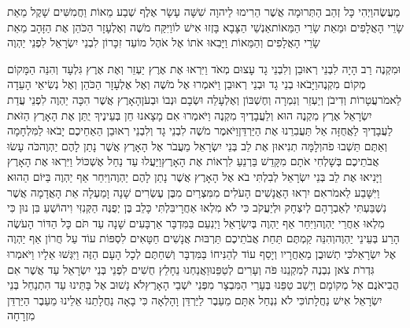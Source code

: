 \documentclass[../main/main.tex]{subfiles}
\begin{document}
\begin{multicols}{\ncols}
מַעֲשֶׂה\PreVerseSpace{}וַיְהִי כָּל זְהַב הַתְּרוּמָה אֲשֶׁר הֵרִימוּ לַיהוָה שִׁשָּׁה עָשָׂר אֶלֶף שְׁבַע מֵאוֹת וַחֲמִשִּׁים שָׁקֶל מֵאֵת שָׂרֵי הָאֲלָפִים וּמֵאֵת שָׂרֵי הַמֵּאוֹת\PreVerseSpace{}אַנְשֵׁי הַצָּבָא בָּזְזוּ אִישׁ לוֹ\PreVerseSpace{}וַיִּקַּח מֹשֶׁה וְאֶלְעָזָר הַכֹּהֵן אֶת הַזָּהָב מֵאֵת שָׂרֵי הָאֲלָפִים וְהַמֵּאוֹת וַיָּבִאוּ אֹתוֹ אֶל אֹהֶל מוֹעֵד זִכָּרוֹן לִבְנֵי יִשְׂרָאֵל לִפְנֵי יַהְוֶה\OpenSection{}\par
{}וּמִקְנֶה רַב הָיָה לִבְנֵי רְאוּבֵן וְלִבְנֵי גָד עָצוּם מְאֹד וַיִּרְאוּ אֶת אֶרֶץ יַעְזֵר וְאֶת אֶרֶץ גִּלְעָד וְהִנֵּה הַמָּקוֹם מְקוֹם מִקְנֶה\PreVerseSpace{}וַיָּבֹאוּ בְנֵי גָד וּבְנֵי רְאוּבֵן וַיֹּאמְרוּ אֶל מֹשֶׁה וְאֶל אֶלְעָזָר הַכֹּהֵן וְאֶל נְשִׂיאֵי הָעֵדָה לֵאמֹר\PreVerseSpace{}עֲטָרוֹת וְדִיבֹן וְיַעְזֵר וְנִמְרָה וְחֶשְׁבּוֹן וְאֶלְעָלֵה וּשְׂבָם וּנְבוֹ וּבְעֹן\PreVerseSpace{}הָאָרֶץ אֲשֶׁר הִכָּה יַהְוֶה לִפְנֵי עֲדַת יִשְׂרָאֵל אֶרֶץ מִקְנֶה הוּא וְלַעֲבָדֶיךָ מִקְנֶה \ClosedSection{}וַיֹּאמְרוּ אִם מָצָאנוּ חֵן בְּעֵינֶיךָ יֻתַּן אֶת הָאָרֶץ הַזֹּאת לַעֲבָדֶיךָ לַאֲחֻזָּה אַל תַּעֲבִרֵנוּ אֶת הַיַּרְדֵּן\PreVerseSpace{}וַיֹּאמֶר מֹשֶׁה לִבְנֵי גָד וְלִבְנֵי רְאוּבֵן הַאַחֵיכֶם יָבֹאוּ לַמִּלְחָמָה וְאַתֶּם תֵּשְׁבוּ פֹה\PreVerseSpace{}וְלָמָּה תְנִיאוּן\SubEnd{} אֶת לֵב בְּנֵי יִשְׂרָאֵל מֵעֲבֹר אֶל הָאָרֶץ אֲשֶׁר נָתַן לָהֶם יַהְוֶה\PreVerseSpace{}כֹּה עָשׂוּ אֲבֹתֵיכֶם בְּשָׁלְחִי אֹתָם מִקָּדֵשׁ בַּרְנֵעַ לִרְאוֹת אֶת הָאָרֶץ\PreVerseSpace{}וַיַּעֲלוּ עַד נַחַל אֶשְׁכּוֹל וַיִּרְאוּ אֶת הָאָרֶץ וַיָּנִיאוּ אֶת לֵב בְּנֵי יִשְׂרָאֵל לְבִלְתִּי בֹא אֶל הָאָרֶץ אֲשֶׁר נָתַן לָהֶם יַהְוֶה\PreVerseSpace{}וַיִּחַר אַף יַהְוֶה בַּיּוֹם הַהוּא וַיִּשָּׁבַע לֵאמֹר\PreVerseSpace{}אִם יִרְאוּ הָאֲנָשִׁים הָעֹלִים מִמִּצְרַיִם מִבֶּן עֶשְׂרִים שָׁנָה וָמַעְלָה אֵת הָאֲדָמָה אֲשֶׁר נִשְׁבַּעְתִּי לְאַבְרָהָם לְיִצְחָק וּלְיַעֲקֹב כִּי לֹא מִלְאוּ אַחֲרָי\PreVerseSpace{}בִּלְתִּי כָּלֵב בֶּן יְפֻנֶּה הַקְּנִזִּי וִיהוֹשֻׁעַ בִּן נוּן כִּי מִלְאוּ אַחֲרֵי יַהְוֶה\PreVerseSpace{}וַיִּחַר אַף יַהְוֶה בְּיִשְׂרָאֵל וַיְנִעֵם בַּמִּדְבָּר אַרְבָּעִים שָׁנָה עַד תֹּם כָּל הַדּוֹר הָעֹשֶׂה הָרַע בְּעֵינֵי יַהְוֶה\PreVerseSpace{}וְהִנֵּה קַמְתֶּם תַּחַת אֲבֹתֵיכֶם תַּרְבּוּת אֲנָשִׁים חַטָּאִים לִסְפּוֹת עוֹד עַל חֲרוֹן אַף יַהְוֶה אֶל יִשְׂרָאֵל\PreVerseSpace{}כִּי תְשׁוּבֻן מֵאַחֲרָיו וְיָסַף עוֹד לְהַנִּיחוֹ בַּמִּדְבָּר וְשִׁחַתֶּם לְכָל הָעָם הַזֶּה \ClosedSection{}וַיִּגְּשׁוּ אֵלָיו וַיֹּאמְרוּ גִּדְרֹת צֹאן נִבְנֶה לְמִקְנֵנוּ פֹּה וְעָרִים לְטַפֵּנוּ\PreVerseSpace{}וַאֲנַחְנוּ נֵחָלֵץ חֻשִׁים לִפְנֵי בְּנֵי יִשְׂרָאֵל עַד אֲשֶׁר אִם הֲבִיאֹנֻם אֶל מְקוֹמָם וְיָשַׁב טַפֵּנוּ בְּעָרֵי הַמִּבְצָר מִפְּנֵי יֹשְׁבֵי הָאָרֶץ\PreVerseSpace{}לֹא נָשׁוּב אֶל בָּתֵּינוּ עַד הִתְנַחֵל בְּנֵי יִשְׂרָאֵל אִישׁ נַחֲלָתוֹ\PreVerseSpace{}כִּי לֹא נִנְחַל אִתָּם מֵעֵבֶר לַיַּרְדֵּן וָהָלְאָה כִּי בָאָה נַחֲלָתֵנוּ אֵלֵינוּ מֵעֵבֶר הַיַּרְדֵּן מִזְרָחָה\OpenSection{}\par

\end{multicols}
\end{document}
